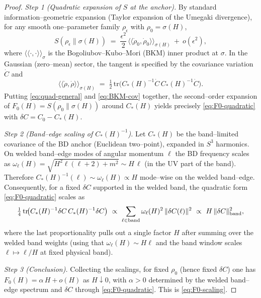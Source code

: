 \documentclass[10pt]{article}
\theoremstyle{definition}
\theoremstyle{plain}
\begin{document}
\begin{proof}
\emph{Step 1 (Quadratic expansion of $S$ at the anchor).}
By standard information–geometric expansion (Taylor expansion of the Umegaki divergence), for any smooth
one–parameter family $\rho_\epsilon$ with $\rho_0=\sigma(H)$,
\begin{equation}\label{eq:quad-general}
S(\rho_\epsilon\|\sigma(H))\;=\;\frac{\epsilon^2}{2}\,\big\langle\!\big\langle \dot\rho_0,\dot\rho_0\big\rangle\!\big\rangle_{\sigma(H)}
\ +\ o(\epsilon^2),
\end{equation}
where $\langle\!\langle\cdot,\cdot\rangle\!\rangle_{\sigma}$ is the Bogoliubov–Kubo–Mori (BKM) inner product at $\sigma$.
In the Gaussian (zero–mean) sector, the tangent is specified by the covariance variation $\dot C$ and
\begin{equation}\label{eq:BKM-cov}
\big\langle\!\big\langle \dot\rho,\dot\rho\big\rangle\!\big\rangle_{\sigma(H)}
\;=\;\tfrac12\,\mathrm{tr}\!\big(C_\ast(H)^{-1}\dot C\,C_\ast(H)^{-1}\dot C\big).
\end{equation}
Putting \eqref{eq:quad-general} and \eqref{eq:BKM-cov} together, the second–order expansion of
$F_0(H)=S(\rho_0\|\sigma(H))$ around $C_\ast(H)$ yields precisely \eqref{eq:F0-quadratic} with
$\delta C=C_0-C_\ast(H)$.

\emph{Step 2 (Band–edge scaling of $C_\ast(H)^{-1}$).}
Let $C_\ast(H)$ be the band–limited covariance of the BD anchor (Euclidean two–point), expanded in
$S^3$ harmonics. On welded band–edge modes of angular momentum $\ell$ the BD frequency scales as
$\omega_\ell(H)=\sqrt{H^2\ell(\ell+2)+m^2}\sim H\,\ell$ (in the UV part of the band). Therefore
$C_\ast(H)^{-1}(\ell)\sim \omega_\ell(H)\propto H$ mode–wise on the welded band–edge. Consequently,
for a fixed $\delta C$ supported in the welded band, the quadratic form \eqref{eq:F0-quadratic} scales as
\[
\tfrac14\,\mathrm{tr}\!\big(C_\ast(H)^{-1}\delta C\,C_\ast(H)^{-1}\delta C\big)\ \propto\ 
\sum_{\ell\in{\rm band}} \omega_\ell(H)^2\,\|\delta C(\ell)\|^2
\ \propto\ H\,\|\delta C\|^2_{\rm band},
\]
where the last proportionality pulls out a single factor $H$ after summing over the welded band weights
(using that $\omega_\ell(H)\sim H\ell$ and the band window scales $\ell\mapsto \ell/H$ at fixed physical band).

\emph{Step 3 (Conclusion).}
Collecting the scalings, for fixed $\rho_0$ (hence fixed $\delta C$) one has
$F_0(H)=\alpha\,H+o(H)$ as $H\downarrow 0$, with $\alpha>0$ determined by the welded band–edge spectrum and
$\delta C$ through \eqref{eq:F0-quadratic}. This is \eqref{eq:F0-scaling}.
\end{proof}
\end{document}
